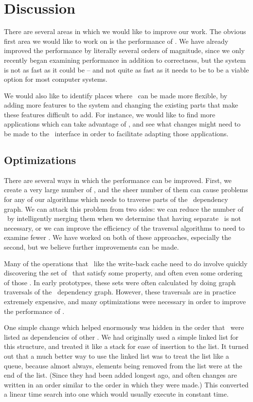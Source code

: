 \section {Discussion}
\label{sec:discussion}

There are several areas in which we would like to improve our work. The obvious
first area we would like to work on is the performance of \Kudos. We have
already improved the performance by literally several orders of magnitude, since
we only recently began examining performance in addition to correctness, but the
system is not as fast as it could be -- and not quite as fast as it needs to be
to be a viable option for most computer systems.

We would also like to identify places where \Kudos\ can be made more flexible,
by adding more features to the system and changing the existing parts that make
these features difficult to add. For instance, we would like to find more
applications which can take advantage of \opgroups, and see what changes might
need to be made to the \opgroup\ interface in order to facilitate adapting those
applications.

\subsection {Optimizations}
There are several ways in which the performance can be improved. First, we
create a very large number of \chdescs, and the sheer number of them can cause
problems for any of our algorithms which needs to traverse parts of the \chdesc\
dependency graph. We can attack this problem from two sides: we can reduce the
number of \chdescs\ by intelligently merging them when we determine that having
separate \chdescs\ is not necessary, or we can improve the efficiency of the
traversal algorithms to need to examine fewer \chdescs. We have worked on both
of these approaches, especially the second, but we believe further improvements
can be made.

Many of the operations that \modules\ like the write-back cache need to do
involve quickly discovering the set of \chdescs\ that satisfy some property, and
often even some ordering of those \chdescs. In early prototypes, these sets were
often calculated by doing graph traversals of the \chdesc\ dependency graph.
However, these traversals are in practice extremely expensive, and many
optimizations were necessary in order to improve the performance of \Kudos.

One simple change which helped enormously was hidden in the order that \chdescs\
were listed as dependencies of other \chdescs. We had originally used a simple
linked list for this structure, and treated it like a stack for ease of
insertion to the list. It turned out that a much better way to use the linked
list was to treat the list like a queue, because almost always, elements being
removed from the list were at the end of the list. (Since they had been added
longest ago, and often changes are written in an order similar to the order in
which they were made.) This converted a linear time search into one which would
usually execute in constant time.

